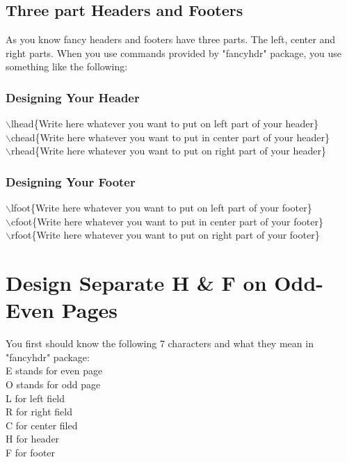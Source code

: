 \documentclass{book}
\begin{document}
\section{Three part Headers and Footers}
As you know fancy headers and footers have three parts. The left, center and right parts. When you use commands provided by "fancyhdr" package, you use something like the following:\\
\subsection{Designing Your Header}
$\backslash$lhead\{Write here whatever you want to put on left part of your header\}\\
$\backslash$chead\{Write here whatever you want to put in center part of your header\}\\
$\backslash$rhead\{Write here whatever you want to put on right part of your header\}\\
\subsection{Designing Your Footer}
$\backslash$lfoot\{Write here whatever you want to put on left part of your footer\}\\
$\backslash$cfoot\{Write here whatever you want to put in center part of your footer\}\\
$\backslash$rfoot\{Write here whatever you want to put on right part of your footer\}\\

\chapter{Design Separate H \& F on Odd-Even Pages}


You first should know the following 7 characters and what they mean in "fancyhdr" package:\\
E stands for even page\\
O stands for odd page\\
L for left field \\
R for right field\\
C for center filed\\
H for header\\
F for footer\\
\end{document}
